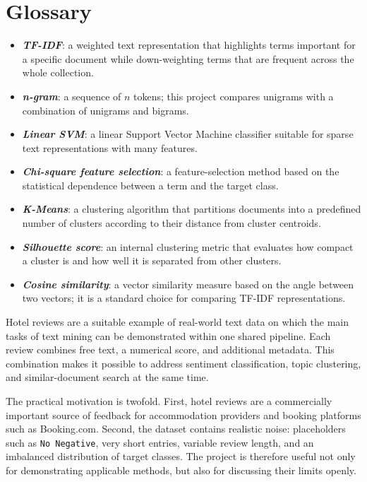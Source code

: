 \documentclass[twoside, 12pt]{article}
\begin{document}
\section*{\LARGE\textbf{Glossary}}

\begin{itemize}
    \item \textbf{\textit{TF-IDF}}: a weighted text representation that highlights terms important for a specific document while down-weighting terms that are frequent across the whole collection.
    \item \textbf{\textit{n-gram}}: a sequence of $n$ tokens; this project compares unigrams with a combination of unigrams and bigrams.
    \item \textbf{\textit{Linear SVM}}: a linear Support Vector Machine classifier suitable for sparse text representations with many features.
    \item \textbf{\textit{Chi-square feature selection}}: a feature-selection method based on the statistical dependence between a term and the target class.
    \item \textbf{\textit{K-Means}}: a clustering algorithm that partitions documents into a predefined number of clusters according to their distance from cluster centroids.
    \item \textbf{\textit{Silhouette score}}: an internal clustering metric that evaluates how compact a cluster is and how well it is separated from other clusters.
    \item \textbf{\textit{Cosine similarity}}: a vector similarity measure based on the angle between two vectors; it is a standard choice for comparing TF-IDF representations.
\end{itemize}


Hotel reviews are a suitable example of real-world text data on which the main tasks of text mining can be demonstrated within one shared pipeline. Each review combines free text, a numerical score, and additional metadata. This combination makes it possible to address sentiment classification, topic clustering, and similar-document search at the same time.

The practical motivation is twofold. First, hotel reviews are a commercially important source of feedback for accommodation providers and booking platforms such as Booking.com. Second, the dataset contains realistic noise: placeholders such as \texttt{No Negative}, very short entries, variable review length, and an imbalanced distribution of target classes. The project is therefore useful not only for demonstrating applicable methods, but also for discussing their limits openly.
\end{document}
